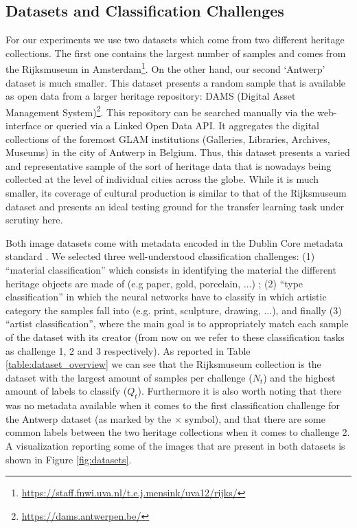 \subsection{Datasets and Classification Challenges}
\label{subsec:datasets}

For our experiments we use two datasets which come from two different heritage collections. The first one contains the largest number of samples and comes from the Rijksmuseum in Amsterdam\footnote{\url{https://staff.fnwi.uva.nl/t.e.j.mensink/uva12/rijks/}}. On the other hand, our second `Antwerp' dataset is much smaller. This dataset presents a random sample that is available as open data from a larger heritage repository: DAMS (Digital Asset Management System)\footnote{\url{https://dams.antwerpen.be/}}. This repository can be searched manually via the web-interface or queried via a Linked Open Data API. It aggregates the digital collections of the foremost GLAM institutions  (Galleries, Libraries, Archives, Museums) in the city of Antwerp in Belgium. Thus, this dataset presents a varied and representative sample of the sort of heritage data that is nowadays being collected at the level of individual cities across the globe. While it is much smaller, its coverage of cultural production is similar to that of the Rijksmuseum dataset and presents an ideal testing ground for the transfer learning task under scrutiny here.

Both image datasets come with metadata encoded in the Dublin Core metadata standard \cite{weibel1998dublin}. We selected three well-understood classification challenges: (1) ``material classification'' which consists in identifying the material the different heritage objects are made of (e.g paper, gold, porcelain, ...) ;  (2) ``type classification'' in which the neural networks have to classify in which artistic category the samples fall into (e.g. print, sculpture, drawing, ...), and finally (3) ``artist classification'', where the main goal is to appropriately match each sample of the dataset with its creator (from now on we refer to these classification tasks as challenge 1, 2 and 3 respectively). As reported in Table \ref{table:dataset_overview} we can see that the Rijksmuseum collection is the dataset with the largest amount of samples per challenge ($N_t$) and the highest amount of labels to classify ($Q_t$). Furthermore it is also worth noting that there was no metadata available when it comes to the first classification challenge for the Antwerp dataset (as marked by the $\times$ symbol), and that there are some common labels between the two heritage collections when it comes to challenge 2. A visualization reporting some of the images that are present in both datasets is shown in Figure \ref{fig:datasets}.


